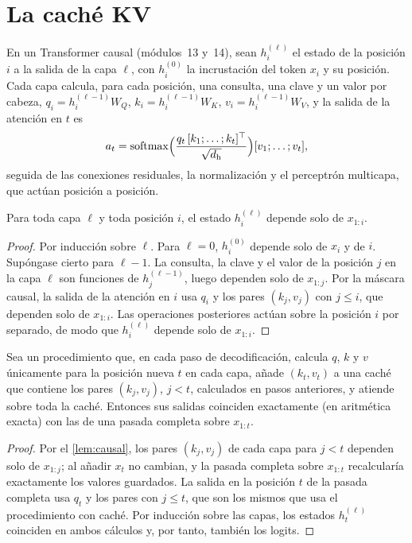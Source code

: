 \section{La caché KV}

En un Transformer causal (módulos~13 y~14), sean $h^{(\ell)}_i$ el estado de la posición $i$ a la salida de la capa $\ell$, con $h^{(0)}_i$ la incrustación del token $x_i$ y su posición. Cada capa calcula, para cada posición, una consulta, una clave y un valor por cabeza, $q_i=h^{(\ell-1)}_iW_Q$, $k_i=h^{(\ell-1)}_iW_K$, $v_i=h^{(\ell-1)}_iW_V$, y la salida de la atención en $t$ es
\[
a_t=\operatorname{softmax}\Bigl(\frac{q_t\,[k_1;\dots;k_t]^{\top}}{\sqrt{d_{\mathrm{h}}}}\Bigr)[v_1;\dots;v_t],
\]
seguida de las conexiones residuales, la normalización y el perceptrón multicapa, que actúan posición a posición.

\begin{lema}\label{lem:causal}
Para toda capa $\ell$ y toda posición $i$, el estado $h^{(\ell)}_i$ depende solo de $x_{1:i}$.
\end{lema}

\begin{proof}
Por inducción sobre $\ell$. Para $\ell=0$, $h^{(0)}_i$ depende solo de $x_i$ y de $i$. Supóngase cierto para $\ell-1$. La consulta, la clave y el valor de la posición $j$ en la capa $\ell$ son funciones de $h^{(\ell-1)}_j$, luego dependen solo de $x_{1:j}$. Por la máscara causal, la salida de la atención en $i$ usa $q_i$ y los pares $(k_j,v_j)$ con $j\le i$, que dependen solo de $x_{1:i}$. Las operaciones posteriores actúan sobre la posición $i$ por separado, de modo que $h^{(\ell)}_i$ depende solo de $x_{1:i}$.
\end{proof}

\begin{teorema}\label{teo:cache}
Sea un procedimiento que, en cada paso de decodificación, calcula $q$, $k$ y $v$ únicamente para la posición nueva $t$ en cada capa, añade $(k_t,v_t)$ a una caché que contiene los pares $(k_j,v_j)$, $j<t$, calculados en pasos anteriores, y atiende sobre toda la caché. Entonces sus salidas coinciden exactamente (en aritmética exacta) con las de una pasada completa sobre $x_{1:t}$.
\end{teorema}

\begin{proof}
Por el \cref{lem:causal}, los pares $(k_j,v_j)$ de cada capa para $j<t$ dependen solo de $x_{1:j}$; al añadir $x_t$ no cambian, y la pasada completa sobre $x_{1:t}$ recalcularía exactamente los valores guardados. La salida en la posición $t$ de la pasada completa usa $q_t$ y los pares con $j\le t$, que son los mismos que usa el procedimiento con caché. Por inducción sobre las capas, los estados $h^{(\ell)}_t$ coinciden en ambos cálculos y, por tanto, también los logits.
\end{proof}

